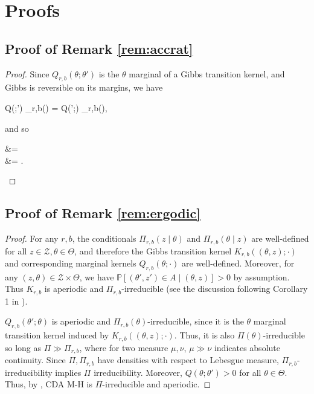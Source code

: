 \documentclass[12pt]{article}
\newcommand{\be}{\begin{equs}}
\newcommand{\ee}{\end{equs}}
\newcommand{\bb}[1]{\mathbb{#1}}
\newcommand{\mc}[1]{\mathcal{#1}}
\begin{document}
\appendix
\section{Proofs}

\subsection{Proof of Remark \ref{rem:accrat}}
\begin{proof}
Since $Q_{r,b}(\theta;\theta')$ is the $\theta$ marginal of a Gibbs transition kernel, and Gibbs is reversible on its margins, we have
\be
Q(\theta;\theta') \Pi_{r,b}(\theta) = Q(\theta';\theta) \Pi_{r,b}(\theta),
\ee 
and so
\be
{} &=  \\
&= .
\ee
\end{proof}

\subsection{Proof of Remark \ref{rem:ergodic}}
\begin{proof}
For any $r,b$, the conditionals $\Pi_{r,b}(z \mid \theta)$ and $\Pi_{r,b}(\theta \mid z)$ are well-defined for all $z \in \mc Z, \theta \in \Theta$, and therefore the Gibbs transition kernel $K_{r,b}((\theta,z);\cdot)$ and corresponding marginal kernels $Q_{r,b}(\theta;\cdot)$ are well-defined. Moreover, for any $(z,\theta) \in \mc Z \times \Theta$, we have $\bb P[(\theta',z') \in A \mid (\theta,z)] > 0$ by assumption. Thus $K_{r,b}$ is aperiodic and $\Pi_{r,b}$-irreducible (see the discussion following Corollary 1 in \cite{roberts1994simple}).

$Q_{r,b}(\theta';\theta)$ is aperiodic and $\Pi_{r,b}(\theta)$-irreducible, since it is the $\theta$ marginal transition kernel induced by $K_{r,b}((\theta,z);\cdot)$. Thus, it is also $\Pi(\theta)$-irreducible so long as $\Pi \gg \Pi_{r,b}$, where for two measure $\mu,\nu$, $\mu \gg \nu$ indicates absolute continuity. Since $\Pi, \Pi_{r,b}$ have densities with respect to Lebesgue measure, $\Pi_{r,b}$-irreducibility implies $\Pi$ irreducibility. Moreover, $Q(\theta;\theta') > 0$ for all $\theta \in \Theta$. Thus, by \cite[Theorem 3]{roberts1994simple}, CDA M-H is $\Pi$-irreducible and aperiodic. 
\end{proof}
\end{document}
